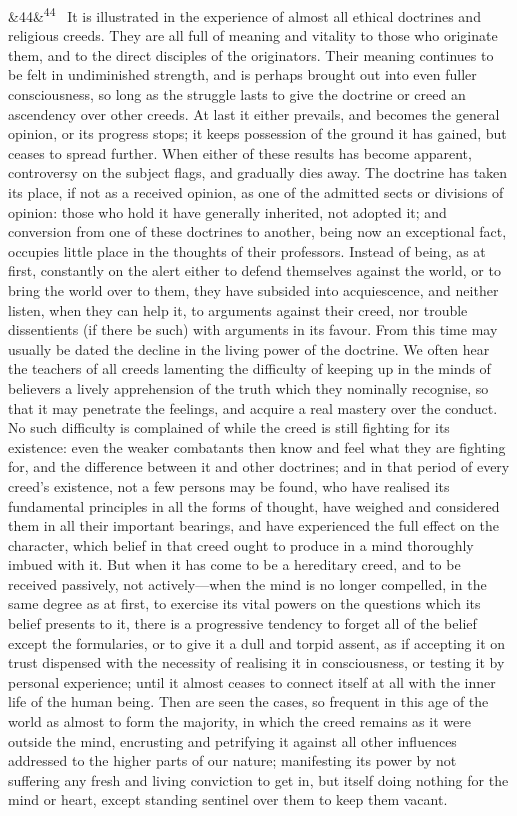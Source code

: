 \documentclass[12pt]{article}
\newcommand{\para}[1][]{\par\noindent\ifx&#1&\else\textsuperscript{\footnotesize #1}~\fi}
\begin{document}
\para[44] It is illustrated in the experience of almost all ethical doctrines and religious creeds. They are all full of meaning and vitality to those who originate them, and to the direct disciples of the originators. Their meaning continues to be felt in undiminished strength, and is perhaps brought out into even fuller consciousness, so long as the struggle lasts to give the doctrine or creed an ascendency over other creeds. At last it either prevails, and becomes the general opinion, or its progress stops; it keeps possession of the ground it has gained, but ceases to spread further. When either of these results has become apparent, controversy on the subject flags, and gradually dies away. The doctrine has taken its place, if not as a received opinion, as one of the admitted sects or divisions of opinion: those who hold it have generally inherited, not adopted it; and conversion from one of these doctrines to another, being now an exceptional fact, occupies little place in the thoughts of their professors. Instead of being, as at first, constantly on the alert either to defend themselves against the world, or to bring the world over to them, they have subsided into acquiescence, and neither listen, when they can help it, to arguments against their creed, nor trouble dissentients (if there be such) with arguments in its favour. From this time may usually be dated the decline in the living power of the doctrine. We often hear the teachers of all creeds lamenting the difficulty of keeping up in the minds of believers a lively apprehension of the truth which they nominally recognise, so that it may penetrate the feelings, and acquire a real mastery over the conduct. No such difficulty is complained of while the creed is still fighting for its existence: even the weaker combatants then know and feel what they are fighting for, and the difference between it and other doctrines; and in that period of every creed's existence, not a few persons may be found, who have realised its fundamental principles in all the forms of thought, have weighed and considered them in all their important bearings, and have experienced the full effect on the character, which belief in that creed ought to produce in a mind thoroughly imbued with it. But when it has come to be a hereditary creed, and to be received passively, not actively---when the mind is no longer compelled, in the same degree as at first, to exercise its vital powers on the questions which its belief presents to it, there is a progressive tendency to forget all of the belief except the formularies, or to give it a dull and torpid assent, as if accepting it on trust dispensed with the necessity of realising it in consciousness, or testing it by personal experience; until it almost ceases to connect itself at all with the inner life of the human being. Then are seen the cases, so frequent in this age of the world as almost to form the majority, in which the creed remains as it were outside the mind, encrusting and petrifying it against all other influences addressed to the higher parts of our nature; manifesting its power by not suffering any fresh and living conviction to get in, but itself doing nothing for the mind or heart, except standing sentinel over them to keep them vacant.
\end{document}

